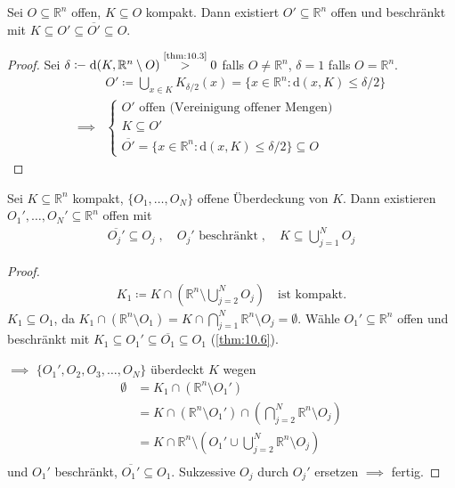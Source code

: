 \documentclass[a4paper,10pt]{scrbook}
\begin{document}
\begin{theorem}[Satz] \label{thm:10.6}
  Sei $O \subseteq \mathbb{R}^n$ offen, $K \subseteq O$ kompakt. Dann existiert $O' \subseteq \mathbb{R}^n$ offen und beschränkt mit $K \subseteq O' \subseteq \overline{O'} \subseteq O$.

  \begin{proof}
    Sei $\delta \coloneq \mathrm{d}(K,\mathbb{R}^n \setminus O) \overset{\text{\ref{thm:10.3}}}{>} 0$ falls $O \neq \mathbb{R}^n$, $\delta = 1$ falls $O = \mathbb{R}^n$.
    \begin{align*}
      & O' \coloneq \bigcup\limits_{x \in K} K_{\delta/2}(x) = \{ x \in \mathbb{R}^n : \mathrm{d}(x,K) \leq \delta/2 \} \\
      \implies &
      \begin{cases}
        O' \text{ offen (Vereinigung offener Mengen)} \\
        K \subseteq O' \\
        \overline{O'} = \{ x \in \mathbb{R}^n : \mathrm{d}(x,K) \leq \delta/2 \} \subseteq O
      \end{cases}
    \end{align*}
  \end{proof}
\end{theorem}

\begin{theorem}[Satz] \label{thm:10.7}
  Sei $K \subseteq \mathbb{R}^n$ kompakt, $\{ O_1,\ldots,O_N \}$ offene Überdeckung von $K$. Dann existieren $O_1',\ldots,O_N' \subseteq \mathbb{R}^n$ offen mit
  \begin{align*}
    \overline{O_j'} \subseteq O_j \; , \quad O_j' \text{ beschränkt} \; , \quad K \subseteq \bigcup\limits_{j=1}^{N} O_j
  \end{align*}

  \begin{proof}
    \begin{align*}
      K_1 \coloneq K \cap \left( \mathbb{R}^n \setminus \bigcup\limits_{j=2}^{N} O_j \right) \quad \text{ist kompakt.}
    \end{align*}
    $K_1 \subseteq O_1$, da $K_1 \cap (\mathbb{R}^n \setminus O_1) = K \cap \bigcap\limits_{j=1}^{N} \mathbb{R}^n \setminus O_j = \emptyset$. Wähle $O_1' \subseteq \mathbb{R}^n$ offen und beschränkt mit $K_1 \subseteq O_1' \subseteq \overline{O_1} \subseteq O_1$ (\ref{thm:10.6}).

    $\implies$ $\{ O_1',O_2,O_3,\ldots,O_N \}$ überdeckt $K$ wegen
    \begin{align*}
      \emptyset
      &= K_1 \cap (\mathbb{R}^n \setminus O_1') \\
      &= K \cap (\mathbb{R}^n \setminus O_1') \cap \left( \bigcap\limits_{j=2}^{N} \mathbb{R}^n \setminus O_j \right) \\
      &= K \cap \mathbb{R}^n \setminus \left( O_1' \cup \bigcup\limits_{j=2}^{N} \mathbb{R}^n \setminus O_j \right) \\
    \end{align*}
    und $O_1'$ beschränkt, $\overline{O_1'} \subseteq O_1$. Sukzessive $O_j$ durch $O_j'$ ersetzen $\implies$ fertig.
  \end{proof}
\end{theorem}
\end{document}
